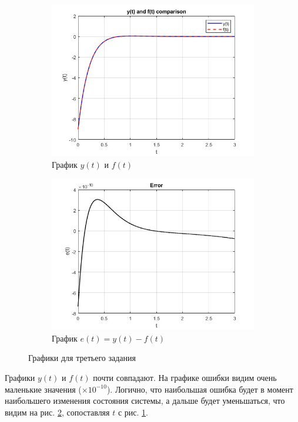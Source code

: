 \documentclass[a4paper, 12pt]{article}
\begin{document}
    \begin{figure}[H]
        \centering
        \begin{subfigure}{0.45\textwidth}
            \centering
            \includegraphics[width=\linewidth]{task_3_y_t_f_t.jpg}
            \caption{График $y(t)$ и $f(t)$}
            \label{fig:task_3_y_t_f_t}
        \end{subfigure}
        \hfill
        \begin{subfigure}{0.45\textwidth}
            \centering
            \includegraphics[width=\linewidth]{task_3_err.jpg}
            \caption{График $e(t)=y(t)-f(t)$}
            \label{fig:task_3_err}
        \end{subfigure}
        \caption{Графики для третьего задания}
        \label{fig:task_3_modeling}
    \end{figure}
    \noindent Графики $y(t)$ и $f(t)$ почти совпадают. На графике ошибки видим очень маленькие значения ($\times10^{-10}$).
    Логично, что наибольшая ошибка будет в момент наибольшего изменения состояния системы, а дальше будет уменьшаться, что видим на рис. \ref{fig:task_3_err},
    сопоставляя $t$ с рис. \ref{fig:task_3_y_t_f_t}.
\end{document}

